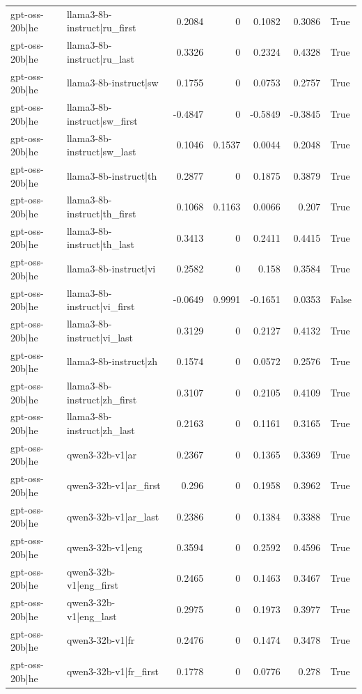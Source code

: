 \begin{table}
\begin{tabular}{l l r r r r l}
gpt-oss-20b|he & llama3-8b-instruct|ru_first & 0.2084 & 0 & 0.1082 & 0.3086 & True \\
gpt-oss-20b|he & llama3-8b-instruct|ru_last & 0.3326 & 0 & 0.2324 & 0.4328 & True \\
gpt-oss-20b|he & llama3-8b-instruct|sw & 0.1755 & 0 & 0.0753 & 0.2757 & True \\
gpt-oss-20b|he & llama3-8b-instruct|sw_first & -0.4847 & 0 & -0.5849 & -0.3845 & True \\
gpt-oss-20b|he & llama3-8b-instruct|sw_last & 0.1046 & 0.1537 & 0.0044 & 0.2048 & True \\
gpt-oss-20b|he & llama3-8b-instruct|th & 0.2877 & 0 & 0.1875 & 0.3879 & True \\
gpt-oss-20b|he & llama3-8b-instruct|th_first & 0.1068 & 0.1163 & 0.0066 & 0.207 & True \\
gpt-oss-20b|he & llama3-8b-instruct|th_last & 0.3413 & 0 & 0.2411 & 0.4415 & True \\
gpt-oss-20b|he & llama3-8b-instruct|vi & 0.2582 & 0 & 0.158 & 0.3584 & True \\
gpt-oss-20b|he & llama3-8b-instruct|vi_first & -0.0649 & 0.9991 & -0.1651 & 0.0353 & False \\
gpt-oss-20b|he & llama3-8b-instruct|vi_last & 0.3129 & 0 & 0.2127 & 0.4132 & True \\
gpt-oss-20b|he & llama3-8b-instruct|zh & 0.1574 & 0 & 0.0572 & 0.2576 & True \\
gpt-oss-20b|he & llama3-8b-instruct|zh_first & 0.3107 & 0 & 0.2105 & 0.4109 & True \\
gpt-oss-20b|he & llama3-8b-instruct|zh_last & 0.2163 & 0 & 0.1161 & 0.3165 & True \\
gpt-oss-20b|he & qwen3-32b-v1|ar & 0.2367 & 0 & 0.1365 & 0.3369 & True \\
gpt-oss-20b|he & qwen3-32b-v1|ar_first & 0.296 & 0 & 0.1958 & 0.3962 & True \\
gpt-oss-20b|he & qwen3-32b-v1|ar_last & 0.2386 & 0 & 0.1384 & 0.3388 & True \\
gpt-oss-20b|he & qwen3-32b-v1|eng & 0.3594 & 0 & 0.2592 & 0.4596 & True \\
gpt-oss-20b|he & qwen3-32b-v1|eng_first & 0.2465 & 0 & 0.1463 & 0.3467 & True \\
gpt-oss-20b|he & qwen3-32b-v1|eng_last & 0.2975 & 0 & 0.1973 & 0.3977 & True \\
gpt-oss-20b|he & qwen3-32b-v1|fr & 0.2476 & 0 & 0.1474 & 0.3478 & True \\
gpt-oss-20b|he & qwen3-32b-v1|fr_first & 0.1778 & 0 & 0.0776 & 0.278 & True \\

\end{tabular}
\end{table}
